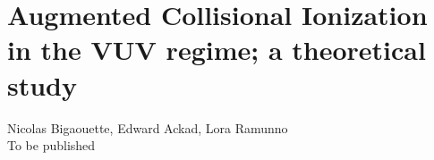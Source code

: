 
\newcommand{\PaperTitleHundrednm}{Augmented Collisional Ionization in the VUV regime; a theoretical study}

\section{\PaperTitleHundrednm}
\label{section:papers:100nm}

\begin{flushright}
Nicolas Bigaouette, Edward Ackad, Lora Ramunno\\
To be published
\end{flushright}

\HidePDFAbstractNumber


